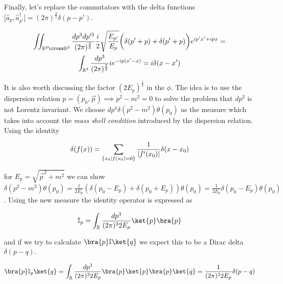 Finally, let's replace the commutators with the delta functions $\big[\hat{a}_{p}, \hat{a}^{\dagger}_{p'} \big] = (2 \pi)^{\frac{3}{2}} \delta(p - p')$.

\begin{equation*}
    \begin{gathered}
        \iint_{\mathbb{R}^{3} \cross \mathbb{R}^{3}} \frac{dp^{3} dp'^{3}}{(2 \pi)^{\frac{3}{2}}} \frac{i}{2} \sqrt{\frac{E_{p'}}{E_{p}}}
        \bigg( \delta(p' + p) + \delta(p' + p) \bigg) e^{i p' x' + i p x} = \\
        \int_{\mathbb{R}^{3}} \frac{dp^{3}}{(2 \pi)^{\frac{3}{2}}} i e^{- i p(x' - x)} = i \delta(x - x') \\
    \end{gathered}
\end{equation*}

It is also worth discussing the factor $(2 E_{p})^{\frac{1}{2}}$ in the $\phi$. The idea is
to use the dispersion relation $p = (p_{0}, \vec{p}) \implies p^{2} - m^2 = 0$ to solve the problem that $dp^{3}$ is
not Lorentz invariant. We choose $dp^{4} \delta(p^{2} - m^2) \theta(p_{0})$ as the measure which takes into account 
the \textit{mass shell condition} introduced by the dispersion relation. Using the identity

\begin{equation*}
    \delta(f(x)) = \sum_{\{x_{0} \\ | \\ f(x_{0}) = 0\}} \frac{1}{|f'(x_{0})|} \delta(x - x_{0})
\end{equation*}

for $E_{p} = \sqrt{\vec{p}^{2} + m^{2}}$ we can show $\delta(p^{2} - m^2) \theta(p_{0}) = \frac{1}{2 E_{p}} (\delta(p_{0} - E_{p}) + 
\delta(p_{0} + E_{p})) \theta(p_{0}) = \frac{1}{2 E_{p}} \delta(p_{0} - E_{p}) \theta(p_{0})$. Using the new measure the identity
operator is expressed as 

\begin{equation*}
    \mathbb{I}_{p} = \int_{\mathbb{R}} \frac{dp^{3}}{(2 \pi)^{3} 2 E_{p}} \ket{p} \bra{p}
\end{equation*}

and if we try to calculate $\bra{p} \mathbb{I} \ket{q}$ we expect this to be a Dirac delta $\delta(p - q)$.

\begin{equation*}
    \bra{p} \mathbb{I}_{p} \ket{q} = \int_{\mathbb{R}} \frac{dp^{3}}{(2 \pi)^{3} 2 E_{p}} \bra{p} \ket{p} \bra{p}\ket{q} = \frac{1}{(2 \pi)^{3} 2 E_{p}} \delta(p - q)
\end{equation*}

